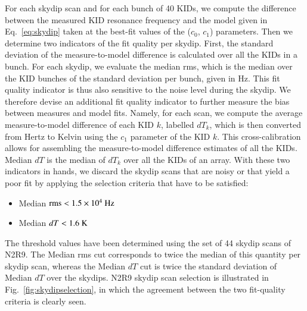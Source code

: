 %

For each skydip scan and for each bunch of 40 KIDs, we compute the
difference between the measured KID resonance frequency and the model
given in Eq.~\ref{eq:skydip} taken at the best-fit values of the
($c_0$, $c_1$) parameters. Then we determine two indicators of the fit
quality per skydip. First, the standard deviation of the
measure-to-model difference is calculated over all the KIDs in a
bunch. For each skydip, we evaluate the median rms, which is the
median over the KID bunches of the standard deviation per bunch, given
in Hz. This fit quality indicator is thus also sensitive to the noise
level during the skydip. We therefore devise an additional fit quality
indicator to further measure the bias between measures and model fits.
Namely, for each scan, we compute the average
measure-to-model difference of each KID $k$, labelled $dT_k$, which is
then converted from Hertz to Kelvin using the $c_1$ parameter of the
KID $k$. This cross-calibration allows for assembling the
measure-to-model difference estimates of all the KIDs.
Median $dT$ is the median of $dT_k$ over all the KIDs of an
array. With these two indicators in hands, we discard the skydip scans
that are noisy or that yield a poor fit by applying the selection
criteria that have to be satisfied:

\begin{itemize}
\item Median $\rm{rms} < 1.5 \times 10^{4}~\rm{Hz}$
\item Median $dT < 1.6~\rm{K}$
\end{itemize}

The threshold values have been determined using the set of 44 skydip
scans of N2R9. The Median rms cut corresponds to twice the median of
this quantity per skydip scan, whereas the Median $dT$ cut is twice
the standard deviation of Median $dT$ over the skydips.
N2R9 skydip scan selection is illustrated in
Fig.~\ref{fig:skydipselection}, in
which the agreement between the two fit-quality criteria is clearly
seen.

